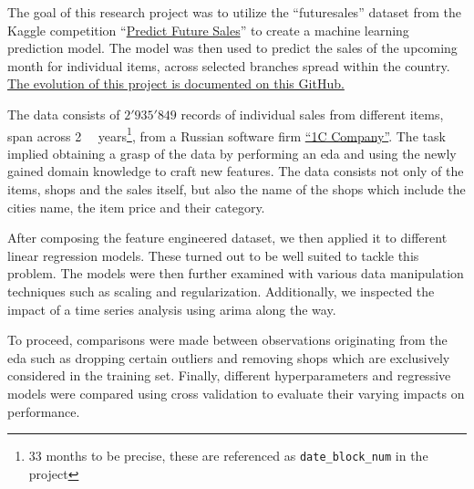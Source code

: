 The goal of this research project was to utilize the \enquote{\gls{futuresales}} dataset from the Kaggle competition \enquote{\href{https://www.kaggle.com/c/competitive-data-science-predict-future-sales}{Predict Future Sales}} to create a machine learning prediction model.
The model was then used to predict the sales of the upcoming month for individual items, across selected branches spread within the country.
\href{\finalRepoMainURL}{The evolution of this project is documented on this GitHub.}

The data consists of $2'935'849$ records of individual sales from different items, span across \mbox{2 \textonehalf} \ years\footnote{33 months to be precise, these are referenced as \texttt{date\_block\_num} in the project}, from a Russian software firm \href{https://1c.ru/eng/title.htm}{\enquote{1C Company}}.
The task implied obtaining a grasp of the data by performing an \acrfull{eda} and using the newly gained domain knowledge to craft new features.
The data consists not only of the items, shops and the sales itself, but also the name of the shops which include the cities name, the item price and their category.

After composing the feature engineered dataset, we then applied it to different linear regression models. These turned out to be well suited to tackle this problem.
The models were then further examined with various data manipulation techniques such as scaling and regularization.
Additionally, we inspected the impact of a time series analysis using \acrshort{arima} along the way.

To proceed, comparisons were made between observations originating from the \acrshort{eda} such as dropping certain outliers and removing shops which are exclusively considered in the training set.
Finally, different \glspl{hyperparameter} and regressive models were compared using cross validation to evaluate their varying impacts on performance.
